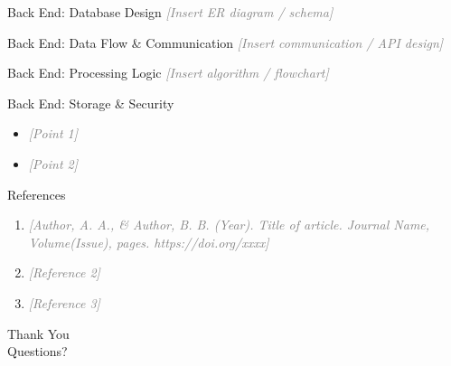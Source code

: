 \documentclass[aspectratio=169,11pt]{beamer}
\newcommand{\placeholder}[1]{\textcolor{gray}{\textit{[#1]}}}
\begin{document}
\begin{frame}{Back End: Database Design}
  \centering
  \placeholder{Insert ER diagram / schema}
\end{frame}

\begin{frame}{Back End: Data Flow \& Communication}
  \centering
  \placeholder{Insert communication / API design}
\end{frame}

\begin{frame}{Back End: Processing Logic}
  \centering
  \placeholder{Insert algorithm / flowchart}
\end{frame}

\begin{frame}{Back End: Storage \& Security}
  \begin{itemize}
    \item \placeholder{Point 1}
    \item \placeholder{Point 2}
  \end{itemize}
\end{frame}

\begin{frame}[allowframebreaks]{References}
  \small
  \begin{enumerate}
    \item[] \placeholder{Author, A. A., \& Author, B. B. (Year). Title of article.
      \textit{Journal Name, Volume}(Issue), pages. https://doi.org/xxxx}
    \item[] \placeholder{Reference 2}
    \item[] \placeholder{Reference 3}
  \end{enumerate}
\end{frame}

\begin{frame}[plain]
  \centering\vfill
  {\Huge Thank You}\\[1em]
  {\large Questions?}
  \vfill
\end{frame}
\end{document}
